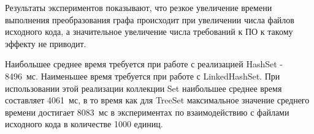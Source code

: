 Результаты экспериментов показывают, что резкое увеличение времени выполнения преобразования графа происходит при увеличении числа файлов исходного кода, а значительное увеличение числа требований к ПО к такому эффекту не приводит.

Наибольшее среднее время требуется при работе с реализацией HashSet - 8496~мс. Наименьшее время требуется при работе с LinkedHashSet. При использовании этой реализации коллекции Set наибольшее среднее время составляет 4061~мс, в то время как для TreeSet максимальное значение среднего времени достигает 8083~мс в экспериментах по взаимодействию с файлами исходного кода в количестве 1000 единиц.
